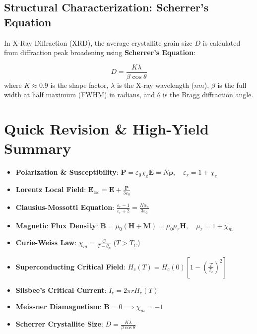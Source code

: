 \subsection{Structural Characterization: Scherrer's Equation}
In X-Ray Diffraction (XRD), the average crystallite grain size $D$ is calculated from diffraction peak broadening using \textbf{Scherrer's Equation}:

\begin{keyequation}
\begin{equation}
    D = \frac{K \lambda}{\beta \cos\theta}
\end{equation}
where $K \approx 0.9$ is the shape factor, $\lambda$ is the X-ray wavelength ($\si{nm}$), $\beta$ is the full width at half maximum (FWHM) in radians, and $\theta$ is the Bragg diffraction angle.
\end{keyequation}

\section{Quick Revision \& High-Yield Summary}

\begin{quickrevision}
\begin{itemize}
    \item \textbf{Polarization \& Susceptibility}: $\mathbf{P} = \varepsilon_0 \chi_e \mathbf{E} = N \mathbf{p}, \quad \varepsilon_r = 1 + \chi_e$
    \item \textbf{Lorentz Local Field}: $\mathbf{E}_{\text{loc}} = \mathbf{E} + \frac{\mathbf{P}}{3\varepsilon_0}$
    \item \textbf{Clausius-Mossotti Equation}: $\frac{\varepsilon_r - 1}{\varepsilon_r + 2} = \frac{N\alpha_e}{3\varepsilon_0}$
    \item \textbf{Magnetic Flux Density}: $\mathbf{B} = \mu_0(\mathbf{H} + \mathbf{M}) = \mu_0 \mu_r \mathbf{H}, \quad \mu_r = 1 + \chi_m$
    \item \textbf{Curie-Weiss Law}: $\chi_m = \frac{C}{T - \theta_p}$ ($T > T_C$)
    \item \textbf{Superconducting Critical Field}: $H_c(T) = H_c(0)\left[ 1 - \left(\frac{T}{T_c}\right)^2 \right]$
    \item \textbf{Silsbee's Critical Current}: $I_c = 2\pi r H_c(T)$
    \item \textbf{Meissner Diamagnetism}: $\mathbf{B}=0 \implies \chi_m = -1$
    \item \textbf{Scherrer Crystallite Size}: $D = \frac{K\lambda}{\beta\cos\theta}$
\end{itemize}
\end{quickrevision}


